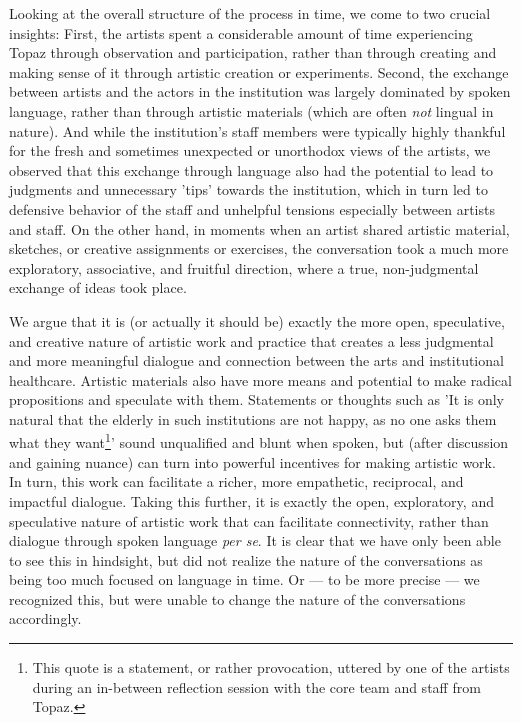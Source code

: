 \documentclass[authordate, empirical]{jote-new-article}
\begin{document}
	Looking at the overall structure of the process in time, we come to two crucial insights: First, the artists spent a considerable amount of time experiencing Topaz through observation and participation, rather than through creating and making sense of it through artistic creation or experiments. Second, the exchange between artists and the actors in the institution was largely dominated by spoken language, rather than through artistic materials (which are often \emph{not} lingual in nature). And while the institution's staff members were typically highly thankful for the fresh and sometimes unexpected or unorthodox views of the artists, we observed that this exchange through language also had the potential to lead to judgments and unnecessary 'tips' towards the institution, which in turn led to defensive behavior of the staff and unhelpful tensions especially between artists and staff. On the other hand, in moments when an artist shared artistic material, sketches, or creative assignments or exercises, the conversation took a much more exploratory, associative, and fruitful direction, where a true, non-judgmental exchange of ideas took place.







	We argue that it is (or actually it should be) exactly the more open, speculative, and creative nature of artistic work and practice that creates a less judgmental and more meaningful dialogue and connection between the arts and institutional healthcare. Artistic materials also have more means and potential to make radical propositions and speculate with them. Statements or thoughts such as 'It is only natural that the elderly in such institutions are not happy, as no one asks them what they want\footnote{This quote is a statement, or rather provocation, uttered by one of the artists during an in-between reflection session with the core team and staff from Topaz.}' sound unqualified and blunt when spoken, but (after discussion and gaining nuance) can turn into powerful incentives for making artistic work. In turn, this work can facilitate a richer, more empathetic, reciprocal, and impactful dialogue. Taking this further, it is exactly the open, exploratory, and speculative nature of artistic work that can facilitate connectivity, rather than dialogue through spoken language \emph{per se}. It is clear that we have only been able to see this in hindsight, but did not realize the nature of the conversations as being too much focused on language in time. Or --- to be more precise --- we recognized this, but were unable to change the nature of the conversations accordingly.
\end{document}
